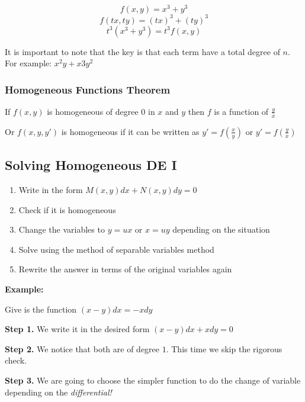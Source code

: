 \[f(x,y) = x^3 + y^3\]
\[f(tx, ty) = {(tx)}^3 + {(ty)}^3\]
\[t^3 (x^3 + y^3) = t^3 f(x,y)\]

It is important to note that the key is that each term have a total degree of \(n\).
For example: \(x^2y + x3y^2\)

\subsubsection{Homogeneous Functions Theorem}

If \(f(x,y)\) is homogeneous of degree \(0\) in \(x\) and \(y\) then 
\(f\) is a function of \(\frac{y}{x}\)

Or \(f(x,y,y')\) is homogeneous if it can be written as \(y' = f(\frac{x}{y})\) or \(y' = f(\frac{y}{x})\)

\subsection{Solving Homogeneous DE I}

\begin{enumerate}
    \item Write in the form \(M(x,y)dx + N(x,y)dy = 0\)
    \item Check if it is homogeneous
    \item Change the variables to \(y = ux\) or \(x = uy\) depending on the situation
    \item Solve using the method of separable variables method
    \item Rewrite the answer in terms of the original variables again
\end{enumerate}

\textbf{Example:}
\vspace{\baselineskip}


Give is the function \((x -y)dx = - xdy\)
\vspace{\baselineskip}

\textbf{Step 1.} We write it in the desired form \((x - y)dx + xdy = 0\)
\vspace{\baselineskip}

\textbf{Step 2.} We notice that both are of degree \(1\). This time we skip the rigorous check.
\vspace{\baselineskip}

\textbf{Step 3.} We are going to choose the simpler function to do the change of variable 
depending on the \emph{differential!} 
\vspace{\baselineskip}


